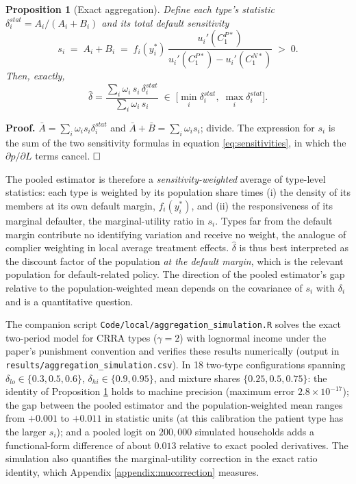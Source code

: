\documentclass[12pt,english]{article}
\newtheorem{proposition}[theorem]{Proposition}
\begin{document}
\begin{proposition}[Exact aggregation]\label{prop:aggT}
Define each type's statistic $\delta_i^{stat} = A_i/(A_i + B_i)$ and its total default sensitivity
\[
s_i \;=\; A_i + B_i \;=\; f_i(y_i^*)\, \frac{u_i'(C_1^{P*})}{u_i'(C_1^{P*}) - u_i'(C_1^{N*})} \;>\; 0.
\]
Then, exactly,
\[
\hat\delta = \frac{\sum_i \omega_i\, s_i\, \delta_i^{stat}}{\sum_i \omega_i\, s_i} \;\in\; \Big[\min_i \delta_i^{stat},\; \max_i \delta_i^{stat}\Big].
\]
\end{proposition}

\noindent\textbf{Proof.} $\bar A = \sum_i \omega_i s_i \delta_i^{stat}$ and $\bar A + \bar B = \sum_i \omega_i s_i$; divide. The expression for $s_i$ is the sum of the two sensitivity formulas in equation \eqref{eq:sensitivities}, in which the $\partial p/\partial L$ terms cancel. $\hfill\square$

The pooled estimator is therefore a \emph{sensitivity-weighted} average of type-level statistics: each type is weighted by its population share times (i) the density of its members at its own default margin, $f_i(y_i^*)$, and (ii) the responsiveness of its marginal defaulter, the marginal-utility ratio in $s_i$. Types far from the default margin contribute no identifying variation and receive no weight, the analogue of complier weighting in local average treatment effects. $\hat\delta$ is thus best interpreted as the discount factor of the population \emph{at the default margin}, which is the relevant population for default-related policy. The direction of the pooled estimator's gap relative to the population-weighted mean depends on the covariance of $s_i$ with $\delta_i$ and is a quantitative question.

The companion script \texttt{Code/local/aggregation\_simulation.R} solves the exact two-period model for CRRA types ($\gamma = 2$) with lognormal income under the paper's punishment convention and verifies these results numerically (output in \texttt{results/aggregation\_simulation.csv}). In 18 two-type configurations spanning $\delta_{lo} \in \{0.3, 0.5, 0.6\}$, $\delta_{hi} \in \{0.9, 0.95\}$, and mixture shares $\{0.25, 0.5, 0.75\}$: the identity of Proposition \ref{prop:aggT} holds to machine precision (maximum error $2.8\times10^{-17}$); the gap between the pooled estimator and the population-weighted mean ranges from $+0.001$ to $+0.011$ in statistic units (at this calibration the patient type has the larger $s_i$); and a pooled logit on $200{,}000$ simulated households adds a functional-form difference of about $0.013$ relative to exact pooled derivatives. The simulation also quantifies the marginal-utility correction in the exact ratio identity, which Appendix \ref{appendix:mucorrection} measures.
\end{document}
